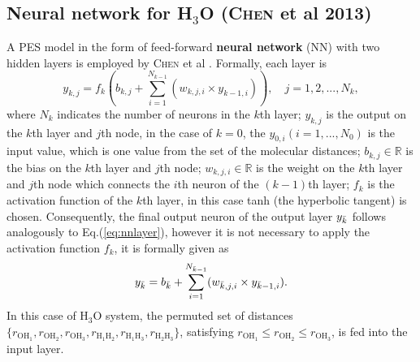 \documentclass[12pt]{article}
\begin{document}
\subsection{Neural network for H$_3$O (\textsc{Chen} et al 2013)}
A PES model in the form of feed-forward \textbf{neural network} (NN) with two hidden layers is employed by \textsc{Chen} et al \cite{idx60}. Formally, each layer is
\begin{equation}
    y_{k,j} = f_k\left(b_{k,j} + \sum^{N_{k-1}}_{i=1}(w_{k,j,i} \times y_{k-1,i})\right), \quad j=1,2,...,N_k,
    \label{eq:nnlayer}
\end{equation}
where $N_k$ indicates the number of neurons in the $k$th layer; $y_{k,j}$ is the output on the $k$th layer and $j$th node, in the case of $k=0$, the $y_{0,i} (i=1,...,N_{0})$ is the input value, which is one value from the set of the molecular distances; $b_{k,j} \in \mathbb{R}$ is the bias on the $k$th layer and $j$th node; $w_{k,j,i} \in \mathbb{R}$ is the weight on the $k$th layer and $j$th node which connects the $i$th neuron of the $(k-1)$th layer; $f_k$ is the activation function of the $k$th layer, in this case tanh (the hyperbolic tangent) is chosen.
Consequently, the final output neuron of the output layer $y_{\Bar{k}}$ follows analogously to Eq.(\ref{eq:nnlayer}), however it is not necessary to apply the activation function $f_k$, it is formally given as
\begin{equation}
    y_{\Bar{k}} = b_{\Bar{k}} +  \sum^{N_{\Bar{k}-1}}_{i=1} (w_{\Bar{k},j,i} \times y_{\Bar{k}-1,i}).
    \label{eq:nnoutput}
\end{equation}
In this case of H$_3$O system, the permuted set of distances $\{r_{\text{OH}_1}, r_{\text{OH}_2}, r_{\text{OH}_3}, r_{{\text{H}_1} {\text{H}_2}}, r_{{\text{H}_1} {\text{H}_3}}, r_{{\text{H}_2} {\text{H}_3}} \}$, satisfying $r_{\text{OH}_1} \leq r_{\text{OH}_2} \leq r_{\text{OH}_3}$, is fed into the input layer. 

\end{document}
